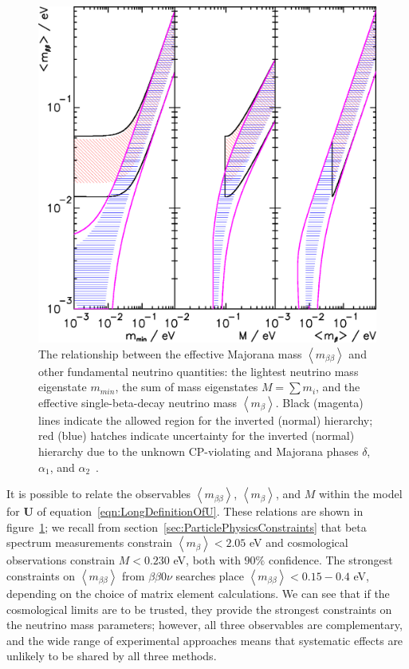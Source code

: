 \begin{figure}
\begin{center}
\includegraphics[keepaspectratio=true,width=\textwidth]{PDGNeutrinoMassBounds.eps}
\end{center}
\caption{The relationship between the effective Majorana mass $\left<m_{\beta\beta}\right>$ and other fundamental neutrino quantities: the lightest neutrino mass eigenstate $m_{min}$, the sum of mass eigenstates $M = \sum m_i$, and the effective single-beta-decay neutrino mass $\left<m_{\beta}\right>$.  Black (magenta) lines indicate the allowed region for the inverted (normal) hierarchy; red (blue) hatches indicate uncertainty for the inverted (normal) hierarchy due to the unknown CP-violating and Majorana phases $\delta$, $\alpha_1$, and $\alpha_2$~\cite{PDG}.}
\label{fig:NeutrinoMassBounds}
\end{figure}

It is possible to relate the observables $\left< m_{\beta\beta} \right>$, $\left< m_\beta \right>$, and $M$ within the model for $\mathbf{U}$ of equation~\ref{eqn:LongDefinitionOfU}.  These relations are shown in figure~\ref{fig:NeutrinoMassBounds}; we recall from section~\ref{sec:ParticlePhysicsConstraints} that beta spectrum measurements constrain $\left<m_\beta\right> < 2.05$ eV and cosmological observations constrain $M < 0.230$ eV, both with $90\%$ confidence.  The strongest constraints on $\left<m_{\beta\beta}\right>$ from $\beta\beta 0\nu$ searches place $\left<m_{\beta\beta}\right> < 0.15-0.4$ eV, depending on the choice of matrix element calculations.  We can see that if the cosmological limits are to be trusted, they provide the strongest constraints on the neutrino mass parameters; however, all three observables are complementary, and the wide range of experimental approaches means that systematic effects are unlikely to be shared by all three methods.


